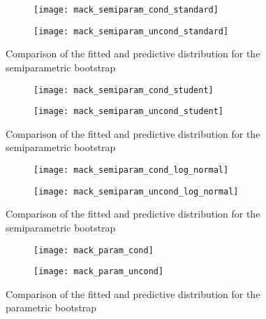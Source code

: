 \documentclass[a4paper]{book}
\begin{document}
\begin{figure}[!htb]
  \begin{subfigure}{0.45 \textwidth}
    \texttt{[image: mack\_semiparam\_cond\_standard]}
  \end{subfigure}
  \begin{subfigure}{0.45 \textwidth}
    \texttt{[image: mack\_semiparam\_uncond\_standard]}
  \end{subfigure}
  \caption{Comparison of the fitted and predictive distribution for the semiparametric bootstrap}
  \label{fig:fit-pred-semiparam-standard}
\end{figure}

\begin{figure}[!htb]
  \begin{subfigure}{0.45 \textwidth}
    \texttt{[image: mack\_semiparam\_cond\_student]}
  \end{subfigure}
  \begin{subfigure}{0.45 \textwidth}
    \texttt{[image: mack\_semiparam\_uncond\_student]}
  \end{subfigure}
  \caption{Comparison of the fitted and predictive distribution for the semiparametric bootstrap}
  \label{fig:fit-pred-semiparam-student}
\end{figure}

\begin{figure}[!htb]
  \begin{subfigure}{0.45 \textwidth}
    \texttt{[image: mack\_semiparam\_cond\_log\_normal]}
  \end{subfigure}
  \begin{subfigure}{0.45 \textwidth}
    \texttt{[image: mack\_semiparam\_uncond\_log\_normal]}
  \end{subfigure}
  \caption{Comparison of the fitted and predictive distribution for the semiparametric bootstrap}
  \label{fig:fit-pred-semiparam-lognromal}
\end{figure}

\restoregeometry

\begin{landscape}
  \begin{figure}
    \begin{subfigure}{\linewidth}
      \texttt{[image: mack\_param\_cond]}
    \end{subfigure}
    \begin{subfigure}{\linewidth}
      \texttt{[image: mack\_param\_uncond]}
    \end{subfigure}
    \caption{Comparison of the fitted and predictive distribution for the parametric bootstrap}
    \label{fig:fit-pred-param}
  \end{figure}
\end{landscape}
\end{document}
